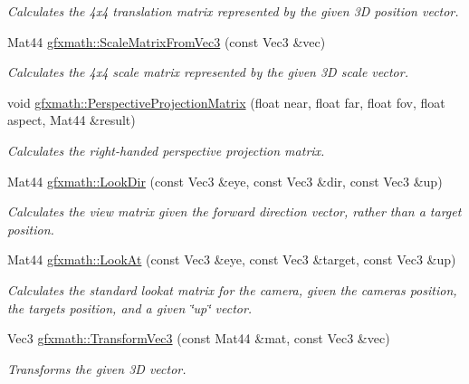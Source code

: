 \begin{DoxyCompactItemize}
\begin{DoxyCompactList}\small\item\em Calculates the 4x4 translation matrix represented by the given 3\+D position vector. \end{DoxyCompactList}\item 
Mat44 \hyperlink{group___s_i_s_d_mat_math_ga8ec877a1635b6a682a15195b47e1f21d}{gfxmath\+::\+Scale\+Matrix\+From\+Vec3} (const Vec3 \&vec)
\begin{DoxyCompactList}\small\item\em Calculates the 4x4 scale matrix represented by the given 3\+D scale vector. \end{DoxyCompactList}\item 
void \hyperlink{group___s_i_s_d_mat_math_ga8aa599fb24b0a8ce16acf8092ee29478}{gfxmath\+::\+Perspective\+Projection\+Matrix} (float near, float far, float fov, float aspect, Mat44 \&result)
\begin{DoxyCompactList}\small\item\em Calculates the right-\/handed perspective projection matrix. \end{DoxyCompactList}\item 
Mat44 \hyperlink{group___s_i_s_d_mat_math_ga1d0cf66e3877d2be1e104bbacec0c917}{gfxmath\+::\+Look\+Dir} (const Vec3 \&eye, const Vec3 \&dir, const Vec3 \&up)
\begin{DoxyCompactList}\small\item\em Calculates the view matrix given the forward direction vector, rather than a target position. \end{DoxyCompactList}\item 
Mat44 \hyperlink{group___s_i_s_d_mat_math_gac420c9cd578ebe0b21c9db7757bc4c2d}{gfxmath\+::\+Look\+At} (const Vec3 \&eye, const Vec3 \&target, const Vec3 \&up)
\begin{DoxyCompactList}\small\item\em Calculates the standard lookat matrix for the camera, given the camera\textquotesingle{}s position, the target\textquotesingle{}s position, and a given \char`\"{}up\char`\"{} vector. \end{DoxyCompactList}\item 
Vec3 \hyperlink{group___s_i_s_d_mat_math_ga503b30792d41234b29089176be81cf6c}{gfxmath\+::\+Transform\+Vec3} (const Mat44 \&mat, const Vec3 \&vec)
\begin{DoxyCompactList}\small\item\em Transforms the given 3\+D vector. \end{DoxyCompactList}\end{DoxyCompactItemize}


